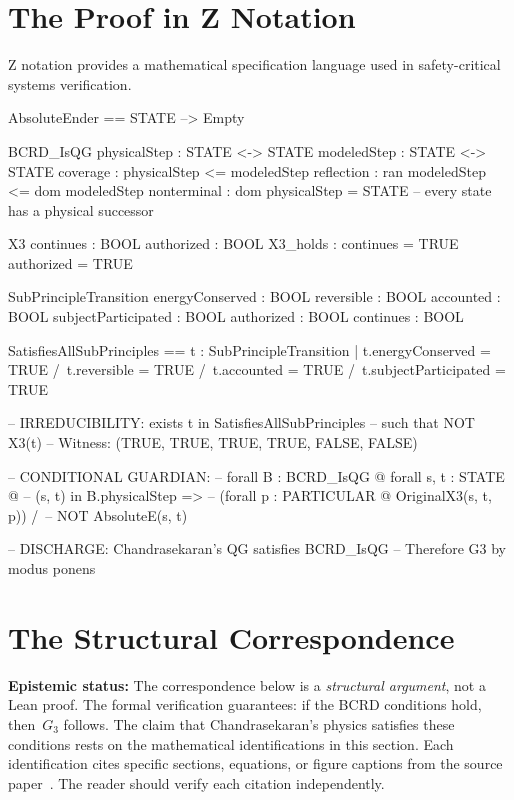 \documentclass[11pt,a4paper]{article}
\theoremstyle{definition}
\theoremstyle{remark}
\begin{document}
\section{The Proof in Z Notation}\label{sec:z}

Z notation provides a mathematical specification language used in safety-critical systems verification.

\begin{zcode}

AbsoluteEnder == STATE --> Empty

BCRD_IsQG
  physicalStep : STATE <-> STATE
  modeledStep : STATE <-> STATE
  coverage : physicalStep <= modeledStep
  reflection : ran modeledStep <= dom modeledStep
  nonterminal : dom physicalStep = STATE
  -- every state has a physical successor

X3
  continues : BOOL
  authorized : BOOL
  X3_holds : continues = TRUE \/ authorized = TRUE

SubPrincipleTransition
  energyConserved : BOOL
  reversible : BOOL
  accounted : BOOL
  subjectParticipated : BOOL
  authorized : BOOL
  continues : BOOL

SatisfiesAllSubPrinciples ==
  { t : SubPrincipleTransition |
    t.energyConserved = TRUE /\
    t.reversible = TRUE /\
    t.accounted = TRUE /\
    t.subjectParticipated = TRUE }

-- IRREDUCIBILITY: exists t in SatisfiesAllSubPrinciples
--   such that NOT X3(t)
-- Witness: (TRUE, TRUE, TRUE, TRUE, FALSE, FALSE)

-- CONDITIONAL GUARDIAN:
-- forall B : BCRD_IsQG @ forall s, t : STATE @
--   (s, t) in B.physicalStep =>
--     (forall p : PARTICULAR @ OriginalX3(s, t, p)) /\
--     NOT AbsoluteE(s, t)

-- DISCHARGE: Chandrasekaran's QG satisfies BCRD_IsQG
-- Therefore G3 by modus ponens
\end{zcode}

\section{The Structural Correspondence}\label{sec:correspondence}

\textbf{Epistemic status:} The correspondence below is a \emph{structural argument}, not a Lean proof. The formal verification guarantees: if the BCRD conditions hold, then~$G_3$ follows. The claim that Chandrasekaran's physics satisfies these conditions rests on the mathematical identifications in this section. Each identification cites specific sections, equations, or figure captions from the source paper~\cite{chandrasekaran2026}. The reader should verify each citation independently.
\end{document}
